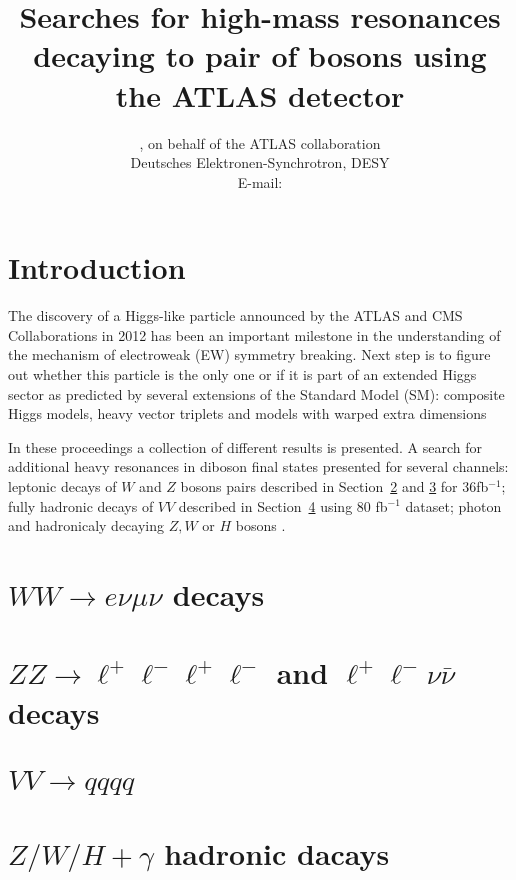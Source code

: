 \documentclass{PoS}
\title{Searches for high-mass resonances decaying to pair of bosons using the ATLAS detector}
\author{\speaker{Kirill Grevtsov}, {on behalf of the ATLAS collaboration}\\%
        Deutsches Elektronen-Synchrotron, DESY\\
        E-mail: \email{kirill.grevtsov@cern.ch}}
\begin{document}
\section{Introduction}

The discovery of a Higgs-like particle announced by the ATLAS and CMS Collaborations in 2012 \cite{HIGG-2012-27} has been an important milestone in the understanding of the mechanism of electroweak (EW) symmetry breaking. %
Next step is to figure out whether this particle is the only one or if it is part of an extended Higgs sector as predicted by several extensions of the Standard Model (SM): composite Higgs models, heavy vector triplets and models with warped extra dimensions


In these proceedings a collection of different results is presented.
A search for additional heavy resonances in diboson final states presented for several channels: leptonic decays of $W$ and $Z$ bosons pairs described in Section~\ref{sec:WW} and \ref{sec:ZZ} for 36fb$^{-1}$; fully hadronic decays of $VV$ described in Section~\ref{sec:VV} using 80 fb$^{-1}$ dataset; photon and hadronicaly decaying $Z,W$ or $H$ bosons .
\section{$WW\rightarrow e\nu \mu \nu$ decays}
\label{sec:WW}

\section{$ZZ\rightarrow \ell^+\ell^-\ell^+\ell^-$ and $\ell^+\ell^-\nu\bar{\nu}$ decays} %
\label{sec:ZZ}

\section{$VV\rightarrow qqqq$}
\label{sec:VV}

\section{$Z/W/H+\gamma$ hadronic dacays}
\label{sec:gV}

\printbibliography
%
\end{document}
